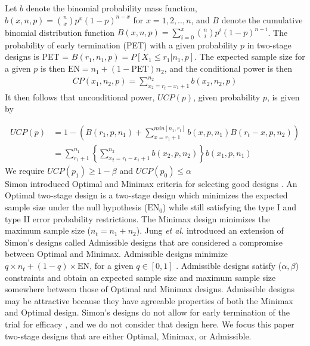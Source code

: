 \documentclass[12pt]{report}\usepackage[]{graphicx}\usepackage[]{color}
\newlength{\li}\setlength{\li}{14.48pt}
\newlength{\di}\setlength{\di}{-3.5mm}
\begin{document}
\indent Let $b$ denote the binomial probability mass function,$b(x,n,p) = {n \choose x} p^x(1-p)^{n-x}$ for $x =  1,2,..,n$, and $B$ denote the cumulative binomial distribution function $B(x,n,p) = \sum_{i=0}^x {n \choose i} p^i(1-p)^{n-i}$. The probability of early termination (PET) with a given probability $p$ in two-stage designs is PET = $B(r_1, n_1, p) = P[X_1 \leq r_1 \vert n_1, p]$. The expected sample size for a given $p$ is then $\mbox{EN} = n_1 + (1-\mbox{PET})n_2$, and the conditional power is then  
\begin{equation}
\begin{aligned}
CP(x_1, n_2, p) = \sum_{x_2 = r_t-x_1+1}^{n_2} b(x_2, n_2, p)
\end{aligned}
\end{equation}
It then follows that unconditional power, $UCP(p)$, given probability $p$, is given by 

\begin{equation}
\begin{aligned}
UCP(p) &= 1 - \left( B(r_1, p, n_1) + \sum_{x=r_1+1}^{min[n_1,{r_t}]} b(x, p, n_1) B(r_t-x,p,n_2) \right) \\
&= \sum_{r_1+1}^{n_1} \left\{\sum_{x_2 = r_t-x_1+1}^{n_2} b(x_2, p, n_2) \right\} b(x_1, p, n_1)
\end{aligned}
\end{equation}
We require $UCP(p_1) \geq 1-\beta$ and $UCP(p_0) \leq \alpha$ \\


\indent Simon introduced Optimal and Minimax criteria for selecting good designs \cite{Simon}. An Optimal two-stage design is a two-stage design which minimizes the expected sample size under the null hypothesis ($\mbox{EN}_0$) while still satisfying the type I and type II error probability restrictions. The Minimax design minimizes the maximum sample size ($n_t = n_1 + n_2$). Jung \textit{et al.} \cite{Jung} introduced an extension of Simon's designs called Admissible designs that are considered a compromise between Optimal and Minimax. Admissible designs minimize $q \times n_t + (1-q) \times \mbox{EN}$, for a given $q \in [0,1]$ \cite{Jung}. Admissible designs satisfy ($\alpha, \beta$) constraints and obtain an expected sample size and maximum sample size somewhere between those of Optimal and Minimax designs. Admissible designs may be attractive because they have agreeable properties of both the Minimax and Optimal design.  Simon's designs do not allow for early termination of the trial for efficacy \cite{Simon}, and we do not consider that design here. We focus this paper two-stage designs that are either Optimal, Minimax, or Admissible. 
\end{document}
